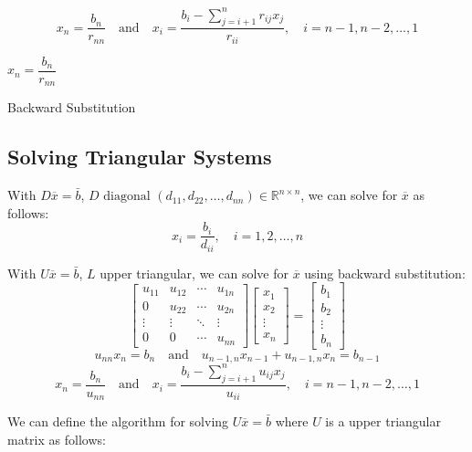 \documentclass[11pt]{article}
\begin{document}
\[ x_n = \frac{b_n}{r_{nn}} \quad \text{and} \quad x_i = \frac{b_i - \sum_{j=i+1}^{n} r_{ij} x_j}{r_{ii}}, \quad i = n-1, n-2, \ldots, 1\]
\begin{algorithm}[H]
$x_n = \dfrac{b_n}{r_{nn}}$\;
\caption{Backward Substitution}
\end{algorithm}

\subsection{Solving Triangular Systems}
With \(D \overline{x} = \bar{b}\), \(D \text{ diagonal } (d_{11}, d_{22}, \ldots, d_{nn}) \in \mathbb{R}^{n\times n}\), we can solve for \(\overline{x}\) as follows:
\[x_i = \frac{b_i}{d_{ii}}, \quad i = 1, 2, \ldots, n\]

With \(U \overline{x} = \bar{b}\), \(L\) upper triangular, we can solve for \(\overline{x}\) using backward substitution:
\[\begin{bmatrix}
    u_{11} & u_{12} & \cdots & u_{1n} \\
    0 & u_{22} & \cdots & u_{2n} \\
    \vdots & \vdots & \ddots & \vdots \\
    0 & 0 & \cdots & u_{nn}
\end{bmatrix} \begin{bmatrix}
    x_1 \\
    x_2 \\
    \vdots \\
    x_n
\end{bmatrix} = \begin{bmatrix}
    b_1 \\
    b_2 \\
    \vdots \\
    b_n
\end{bmatrix}\]
\[u_{nn} x_n = b_n \quad \text{and} \quad u_{n-1,n} x_{n-1} + u_{n-1,n} x_n = b_{n-1}\]
\[ x_n = \frac{b_n}{u_{nn}} \quad \text{and} \quad x_i = \frac{b_i - \sum_{j=i+1}^{n} u_{ij} x_j}{u_{ii}}, \quad i = n-1, n-2, \ldots, 1\]

We can define the algorithm for solving \(U \overline{x} = \bar{b}\) where \(U\) is a upper triangular matrix as follows:
\end{document}
